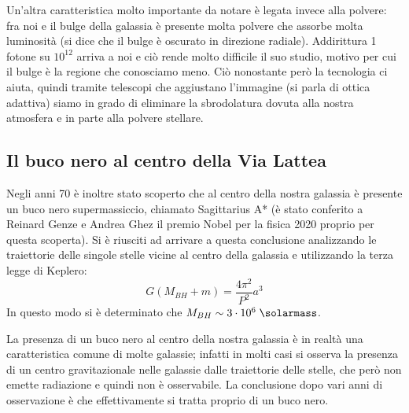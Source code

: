Un'altra caratteristica molto importante da notare è legata invece alla polvere: fra noi e il bulge della galassia è presente molta polvere che assorbe molta luminosità (si dice che il bulge è oscurato in direzione radiale). Addirittura 1 fotone su $10^{12}$ arriva a noi e ciò rende molto difficile il suo studio, motivo per cui il bulge è la regione che conosciamo meno. Ciò nonostante però la tecnologia ci aiuta, quindi tramite telescopi che aggiustano l'immagine (si parla di ottica adattiva) siamo in grado di eliminare la sbrodolatura dovuta alla nostra atmosfera e in parte alla polvere stellare. 

\subsection{Il buco nero al centro della Via Lattea}
Negli anni 70 è inoltre stato scoperto che al centro della nostra galassia è presente un buco nero supermassiccio, chiamato Sagittarius A* (è stato conferito a Reinard Genze e Andrea Ghez il premio Nobel per la fisica 2020 proprio per questa scoperta). Si è riusciti ad arrivare a questa conclusione analizzando le traiettorie delle singole stelle vicine al centro della galassia e utilizzando la terza legge di Keplero: 
\begin{equation*}
    G(M_{BH} + m) = \frac{4\pi^2}{P^2}a^3
\end{equation*}
In questo modo si è determinato che $M_{BH} \sim 3 \cdot 10^6 \;\si{\solarmass}$.

La presenza di un buco nero al centro della nostra galassia è in realtà una caratteristica comune di molte galassie; infatti in molti casi si osserva la presenza di un centro gravitazionale nelle galassie dalle traiettorie delle stelle, che però non emette radiazione e quindi non è osservabile. La conclusione dopo vari anni di osservazione è che effettivamente si tratta proprio di un buco nero.

